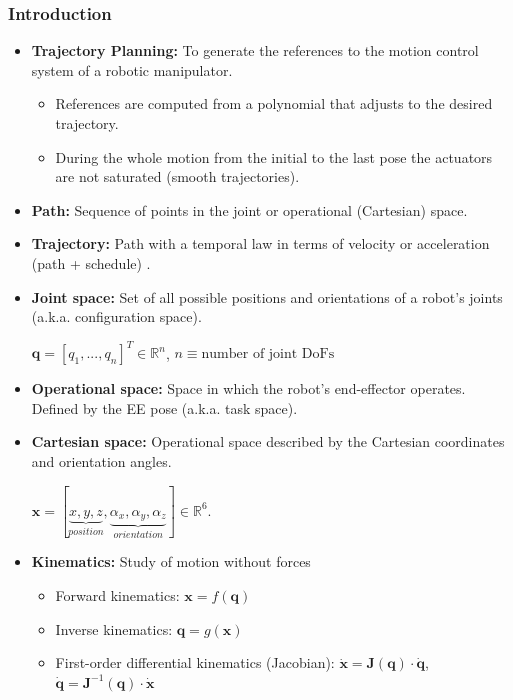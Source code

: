 \documentclass[10pt, aspectratio=169]{beamer}
\theoremstyle{remark}
\theoremstyle{definition}
\begin{document}
\begin{frame}[allowframebreaks]
\frametitle{Introduction}
	\begin{itemize}
    
	    \item \textbf{Trajectory Planning:} To generate the references to the motion control system of a robotic manipulator.
        \begin{itemize}
            \item References are computed from a polynomial that adjusts to the desired trajectory.
            \item During the whole motion from the initial to the last pose the actuators are not saturated (smooth trajectories).
        \end{itemize}
        
    \item \textbf{Path:} Sequence of points in the joint or operational (Cartesian) space. 
    
    \item \textbf{Trajectory:} Path with a temporal law in terms of velocity or acceleration (path + schedule) \cite{paths_and_trajectories}.
    
    \item \textbf{Joint space:} Set of all possible positions and orientations of a robot's joints (a.k.a. configuration space).
    
    $\mathbf{q} = [q_1, ..., q_n ]^T \in \mathbb{R}^n$, $n \equiv \textrm{number of joint DoFs}$ 

    \framebreak
    
    \item \textbf{Operational space:} Space in which the robot's end-effector operates. Defined by the EE pose (a.k.a. task space).

    \item \textbf{Cartesian space:} Operational space described by the Cartesian coordinates and orientation angles.
    
    $\mathbf{x} = [\underbrace{x, y, z}_{position}, \underbrace{\alpha_x, \alpha_y, \alpha_z}_{orientation}] \in \mathbb{R}^6$.

    \item \textbf{Kinematics:} Study of motion without forces

    \begin{itemize}
        \item Forward kinematics: $\mathbf{x} = f(\mathbf{q})$
        \item Inverse kinematics: $\mathbf{q} = g(\mathbf{x})$
        \item First-order differential kinematics (Jacobian): $\mathbf{\dot{x}} = \mathbf{J}(\mathbf{q}) \cdot \mathbf{\dot{q}}$, \hspace{0.2cm} $\mathbf{\dot{q}} = \mathbf{J}^{-1}(\mathbf{q}) \cdot \mathbf{\dot{x}}$
    \end{itemize}
    

\end{itemize}
\end{frame}
\end{document}
